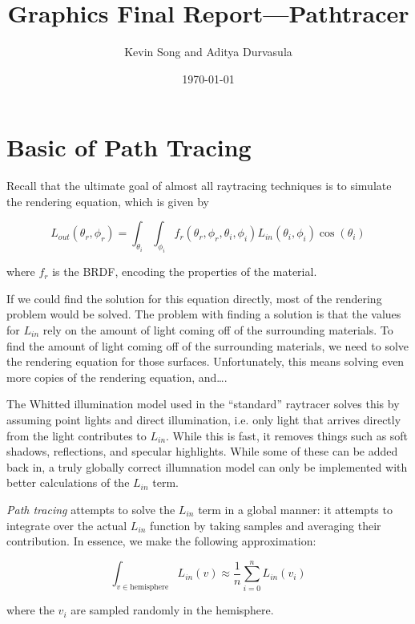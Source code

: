 \documentclass{article}
\title{Graphics Final Report---Pathtracer}
\author{Kevin Song and Aditya Durvasula}
\date{\today}
\begin{document}
\maketitle

\section{Basic of Path Tracing}

Recall that the ultimate goal of almost all raytracing techniques is to simulate
the rendering equation, which is given by 

\begin{equation}
 L_{out}(\theta_r,\phi_r) = \int_{\theta_i} \int_{\phi_i} 
 f_r(\theta_r,\phi_r,\theta_i,\phi_i) L_{in}(\theta_i,\phi_i) \cos(\theta_i)
\end{equation}

where $f_r$ is the BRDF, encoding the properties of the material.

If we could find the solution for this equation directly, most of the rendering
problem would be solved. The problem with finding a solution is that the values 
for $L_{in}$ rely on the amount of light coming off of the surrounding materials.
To find the amount of light coming off of the surrounding materials, we need
to solve the rendering equation for those surfaces. Unfortunately, this means
solving even more copies of the rendering equation, and\dots.

The Whitted illumination model used in the ``standard'' raytracer solves this
by assuming point lights and direct illumination, i.e. only light that arrives
directly from the light contributes to $L_{in}$. While this is fast, it removes
things such as soft shadows, reflections, and specular highlights. While some
of these can be added back in, a truly globally correct illumnation model can
only be implemented with better calculations of the $L_{in}$ term.

\textit{Path tracing} attempts to solve the $L_{in}$ term in a global manner:
it attempts to integrate over the actual $L_{in}$ function by taking samples
and averaging their contribution. In essence, we make the following 
approximation:

\begin{equation}
    \int_{v \in \text{hemisphere}} L_{in}(v) \approx 
    \frac{1}{n} \sum_{i=0}^n L_{in}(v_i)
\end{equation}

where the $v_i$ are sampled randomly in the hemisphere.
\end{document}
